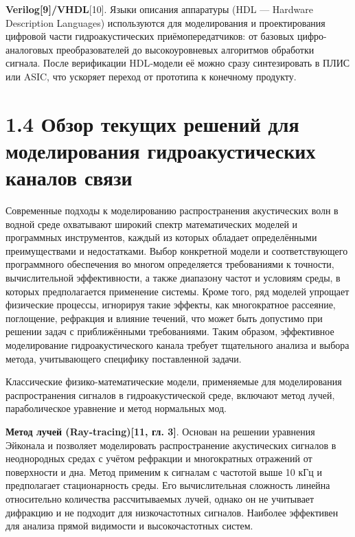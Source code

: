 \textbf{Verilog{[}9{]}/VHDL}{[}10{]}. Языки описания аппаратуры (HDL ---
Hardware Description Languages) используются для моделирования и
проектирования цифровой части гидроакустических приёмопередатчиков: от
базовых цифро-аналоговых преобразователей до высокоуровневых алгоритмов
обработки сигнала. После верификации HDL‑модели её можно сразу
синтезировать в ПЛИС или ASIC, что ускоряет переход от прототипа к
конечному продукту.

\section*{1.4 Обзор текущих решений для моделирования гидроакустических
каналов
связи}\label{ux43eux431ux437ux43eux440-ux442ux435ux43aux443ux449ux438ux445-ux440ux435ux448ux435ux43dux438ux439-ux434ux43bux44f-ux43cux43eux434ux435ux43bux438ux440ux43eux432ux430ux43dux438ux44f-ux433ux438ux434ux440ux43eux430ux43aux443ux441ux442ux438ux447ux435ux441ux43aux438ux445-ux43aux430ux43dux430ux43bux43eux432-ux441ux432ux44fux437ux438}

Современные подходы к моделированию распространения акустических волн в
водной среде охватывают широкий спектр математических моделей и
программных инструментов, каждый из которых обладает определёнными
преимуществами и недостатками. Выбор конкретной модели и
соответствующего программного обеспечения во многом определяется
требованиями к точности, вычислительной эффективности, а также диапазону
частот и условиям среды, в которых предполагается применение системы.
Кроме того, ряд моделей упрощает физические процессы, игнорируя такие
эффекты, как многократное рассеяние, поглощение, рефракция и влияние
течений, что может быть допустимо при решении задач с приближёнными
требованиями. Таким образом, эффективное моделирование
гидроакустического канала требует тщательного анализа и выбора метода,
учитывающего специфику поставленной задачи.

Классические физико-математические модели, применяемые для моделирования
распространения сигналов в гидроакустической среде, включают метод
лучей, параболическое уравнение и метод нормальных мод.

\textbf{Метод лучей (Ray‑tracing){[}11, гл. 3{]}}. Основан на решении
уравнения Эйконала и позволяет моделировать распространение акустических
сигналов в неоднородных средах с учётом рефракции и многократных
отражений от поверхности и дна. Метод применим к сигналам с частотой
выше 10 кГц и предполагает стационарность среды. Его вычислительная
сложность линейна относительно количества рассчитываемых лучей, однако
он не учитывает дифракцию и не подходит для низкочастотных сигналов.
Наиболее эффективен для анализа прямой видимости и высокочастотных
систем.

